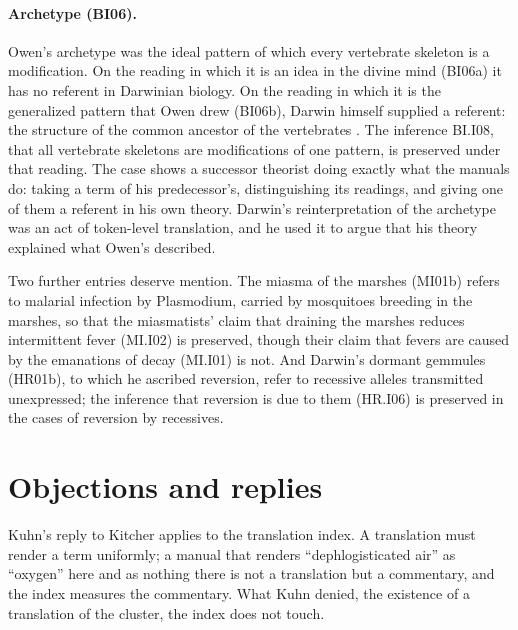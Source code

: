 \documentclass{situationist-preprint}
\begin{document}
\paragraph{Archetype (BI06).} Owen's archetype was the ideal pattern of which every vertebrate skeleton is a modification. On the reading in which it is an idea in the divine mind (BI06a) it has no referent in Darwinian biology. On the reading in which it is the generalized pattern that Owen drew (BI06b), Darwin himself supplied a referent: the structure of the common ancestor of the vertebrates \citep[ch.~13]{Darwin1859}. The inference BI.I08, that all vertebrate skeletons are modifications of one pattern, is preserved under that reading. The case shows a successor theorist doing exactly what the manuals do: taking a term of his predecessor's, distinguishing its readings, and giving one of them a referent in his own theory. Darwin's reinterpretation of the archetype was an act of token-level translation, and he used it to argue that his theory explained what Owen's described.

Two further entries deserve mention. The miasma of the marshes (MI01b) refers to malarial infection by Plasmodium, carried by mosquitoes breeding in the marshes, so that the miasmatists' claim that draining the marshes reduces intermittent fever (MI.I02) is preserved, though their claim that fevers are caused by the emanations of decay (MI.I01) is not. And Darwin's dormant gemmules (HR01b), to which he ascribed reversion, refer to recessive alleles transmitted unexpressed; the inference that reversion is due to them (HR.I06) is preserved in the cases of reversion by recessives.

\section{Objections and replies}\label{s:objections}

\begin{objection}\label{o:tokens}
Kuhn's reply to Kitcher applies to the translation index. A translation must render a term uniformly; a manual that renders \enquote{dephlogisticated air} as \enquote{oxygen} here and as nothing there is not a translation but a commentary, and the index measures the commentary. What Kuhn denied, the existence of a translation of the cluster, the index does not touch.
\end{objection}
\end{document}
